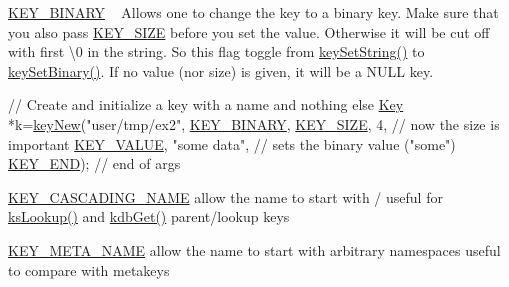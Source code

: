 \begin{DoxyItemize}
\item \hyperlink{group__key_gga91fb3178848bd682000958089abbaf40a1ca18d4e094ae7487d35ecedda2235ff}{K\+E\+Y\+\_\+\+B\+I\+N\+A\+RY} ~\newline
 Allows one to change the key to a binary key. Make sure that you also pass \hyperlink{group__key_gga91fb3178848bd682000958089abbaf40a6d531b5c41445d19d0452eebdccbfa01}{K\+E\+Y\+\_\+\+S\+I\+ZE} before you set the value. Otherwise it will be cut off with first \textbackslash{}0 in the string. So this flag toggle from \hyperlink{group__keyvalue_ga622bde1eb0e0c4994728331326340ef2}{key\+Set\+String()} to \hyperlink{group__keyvalue_gaa50a5358fd328d373a45f395fa1b99e7}{key\+Set\+Binary()}. If no value (nor size) is given, it will be a N\+U\+LL key. 
\begin{DoxyCodeInclude}
\textcolor{comment}{// Create and initialize a key with a name and nothing else}
\hyperlink{classkdb_1_1Key_a5679f5cae63caddd64a60388b9cc77fa}{Key} *k=\hyperlink{group__key_gad23c65b44bf48d773759e1f9a4d43b89}{keyNew}(\textcolor{stringliteral}{"user/tmp/ex2"},
        \hyperlink{group__key_gga91fb3178848bd682000958089abbaf40a1ca18d4e094ae7487d35ecedda2235ff}{KEY\_BINARY},
        \hyperlink{group__key_gga91fb3178848bd682000958089abbaf40a6d531b5c41445d19d0452eebdccbfa01}{KEY\_SIZE}, 4,               \textcolor{comment}{// now the size is important}
        \hyperlink{group__key_gga91fb3178848bd682000958089abbaf40ac66e4a49d09212b79f5754ca6db5bd2e}{KEY\_VALUE}, \textcolor{stringliteral}{"some data"},    \textcolor{comment}{// sets the binary value ("some")}
        \hyperlink{group__key_gga91fb3178848bd682000958089abbaf40aa8adb6fcb92dec58fb19410eacfdd403}{KEY\_END});                  \textcolor{comment}{// end of args}
\end{DoxyCodeInclude}

\item \hyperlink{group__key_gga91fb3178848bd682000958089abbaf40afc1567f74444ff9c219f7456b652b4ec}{K\+E\+Y\+\_\+\+C\+A\+S\+C\+A\+D\+I\+N\+G\+\_\+\+N\+A\+ME} allow the name to start with / useful for \hyperlink{group__keyset_gaa34fc43a081e6b01e4120daa6c112004}{ks\+Lookup()} and \hyperlink{group__kdb_ga28e385fd9cb7ccfe0b2f1ed2f62453a1}{kdb\+Get()} parent/lookup keys
\item \hyperlink{group__key_gga91fb3178848bd682000958089abbaf40a5205cbd2831bc881da3589a95c08e054}{K\+E\+Y\+\_\+\+M\+E\+T\+A\+\_\+\+N\+A\+ME} allow the name to start with arbitrary namespaces useful to compare with metakeys
\end{DoxyItemize}

